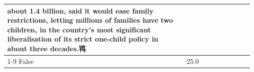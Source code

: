 \begin{table}[H]
\begin{tabular}{lllrlllll}
about 1.4 billion, said it would ease family restrictions, letting millions of families have two children, in the country's most significant liberalisation of its strict one-child policy in about three decades.鸨 \\
\cline{1-9}
False & 25.0%
\end{tabular}
\end{table}
